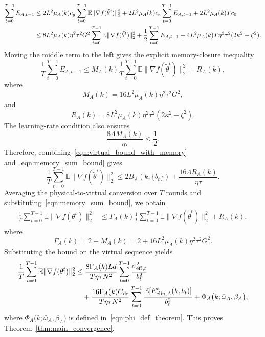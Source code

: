 \documentclass[journal]{IEEEtran}
\begin{document}
\begin{align}
    \sum_{t=0}^{T-1}E_{A,t-1}
    &\le
    2L^2\mu_A(k)c_g
    \sum_{t=0}^{T-1}\mathbb{E}\|\nabla f(\tilde\theta^t)\|_2^2
    +2L^2\mu_A(k)c_e
    \sum_{t=0}^{T-1}E_{A,t-1}
    +2L^2\mu_A(k)Tc_0
    \notag\\
    &\le
    8L^2\mu_A(k)\eta^2\tau^2G^2
    \sum_{t=0}^{T-1}\mathbb{E}\|\nabla f(\tilde\theta^t)\|_2^2
    +\frac12\sum_{t=0}^{T-1}E_{A,t-1}
    +4L^2\mu_A(k)T\eta^2\tau^2(2\kappa^2+\zeta^2).
\end{align}
Moving the middle term to the left gives the explicit memory-closure inequality
\begin{equation}
    \label{eqn:memory_sum_bound}
    \frac1T\sum_{t=0}^{T-1}E_{A,t-1}
    \le
    M_A(k)
    \frac1T\sum_{t=0}^{T-1}\mathbb{E}\|\nabla f(\tilde\theta^t)\|_2^2
    +R_A(k),
\end{equation}
where
\begin{equation}
    M_A(k)=16L^2\mu_A(k)\eta^2\tau^2G^2,
\end{equation}
and
\begin{equation}
    R_A(k)=8L^2\mu_A(k)\eta^2\tau^2(2\kappa^2+\zeta^2).
\end{equation}
The learning-rate condition also ensures
\begin{equation}
    \frac{8\Lambda M_A(k)}{\eta\tau}\le \frac12.
\end{equation}
Therefore, combining~\eqref{eqn:virtual_bound_with_memory} and~\eqref{eqn:memory_sum_bound} gives
\begin{equation}
    \frac1T\sum_{t=0}^{T-1}\mathbb{E}\|\nabla f(\tilde\theta^t)\|_2^2
    \le
    2B_A(k,\{b_t\})+\frac{16\Lambda R_A(k)}{\eta\tau}.
\end{equation}
Averaging the physical-to-virtual conversion over $T$ rounds and substituting~\eqref{eqn:memory_sum_bound}, we obtain
\begin{align}
    \frac1T\sum_{t=0}^{T-1}\mathbb{E}\|\nabla f(\theta^t)\|_2^2
    &\le
    \Gamma_A(k)
    \frac1T\sum_{t=0}^{T-1}\mathbb{E}\|\nabla f(\tilde\theta^t)\|_2^2
    +R_A(k),
\end{align}
where
\begin{equation}
    \Gamma_A(k)=2+M_A(k)=2+16L^2\mu_A(k)\eta^2\tau^2G^2.
\end{equation}
Substituting the bound on the virtual sequence yields
\begin{align}
    \label{eqn:final_dr_convergence_bound}
    \frac1T\sum_{t=0}^{T-1}\mathbb{E}\|\nabla f(\theta^t)\|_2^2
    &\le
    \frac{8\Gamma_A(k)Ld}{T\eta\tau N^2}
    \sum_{t=0}^{T-1}\frac{\sigma_{\mathrm{eff},t}^2}{b_t^2}
    \notag\\
    &\quad+
    \frac{16\Gamma_A(k)C_{\mathrm{dr}}}{T\eta\tau N^2}
    \sum_{t=0}^{T-1}
    \frac{\mathbb{E}[E_{\mathrm{clip},A}^t(k,b_t)]}{b_t^2}
    +\Phi_A\big(k;\bar{\omega}_A,\beta_A\big),
\end{align}
where $\Phi_A\big(k;\bar{\omega}_A,\beta_A\big)$ is defined in~\eqref{eqn:phi_def_theorem}. This proves Theorem~\ref{thm:main_convergence}.
\end{document}
